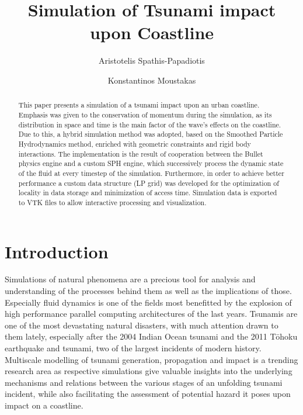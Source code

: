 \documentclass{llncs}
\begin{document}
\title{Simulation of Tsunami impact upon Coastline}


\author{Aristotelis Spathis-Papadiotis \and Konstantinos Moustakas}



\maketitle

\begin{abstract}
  This paper presents a simulation of a tsunami impact upon an urban coastline. Emphasis
  was given to the conservation of momentum during the simulation, as its distribution in
  space and time is the main factor of the wave's effects on the coastline. Due to this, a
  hybrid simulation method was adopted, based on the Smoothed Particle Hydrodynamics
  method, enriched with geometric constraints and rigid body interactions. The
  implementation is the result of cooperation between the Bullet physics engine and a
  custom SPH engine, which successively process the dynamic state of the fluid at every
  timestep of the simulation. Furthermore, in order to achieve better performance a custom
  data structure (LP grid) was developed for the optimization of locality in data storage
  and minimization of access time. Simulation data is exported to VTK files to allow
  interactive processing and visualization. 
\end{abstract}

\section{Introduction}
Simulations of natural phenomena are a precious tool for analysis and understanding of the
processes behind them as well as the implications of those. Especially fluid dynamics is
one of the fields most benefitted by the explosion of high performance parallel computing
architectures of the last years. Tsunamis are one of the most devastating natural
disasters, with much attention drawn to them lately, especially after the 2004 Indian
Ocean tsunami and the 2011 T\={o}hoku earthquake and tsunami, two of the largest incidents
of modern history. Multiscale modelling of tsunami generation, propagation and impact is a
trending research area as respective simulations give valuable insights into the
underlying mechanisms and relations between the various stages of an unfolding tsunami
incident, while also facilitating the assessment of potential hazard it poses upon impact
on a coastline.
\end{document}
